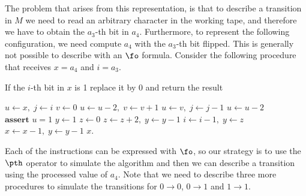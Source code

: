 The problem that arises from this representation, is that to describe a transition in $M$ we need to read an arbitrary character in the working tape, and therefore we have to obtain the $a_3$-th bit in $a_4$. Furthermore, to represent the following configuration, we need compute $a_4$ with the $a_3$-th bit flipped. This is generally not possible to describe with an $\fo$ formula. Consider the following procedure that receives $x = a_4$ and $i = a_3$.

\begin{algorithm}
	\caption{If the $i$-th bit in $x$ is 1 replace it by 0 and return the result}
	\label{switch1to0}
	\begin{algorithmic}
		\State $u \gets x,\; j \gets i$ 
		\State $v \gets 0$
		\State $u \gets u-2,\; v \gets v+1$
		\EndWhile
		\State $u\gets v,\; j \gets j-1$
		\EndWhile
		\State $u \gets u-2$
		\EndWhile
		\State $\textbf{assert } u = 1$ 	
		\State $y \gets 1$ 
		\State $z \gets 0$
		\State $z \gets z+2,\; y \gets y-1$
		\EndWhile
		\State $i \gets i-1,\; y \gets z$
		\EndWhile
		 
		\State $x \gets x-1,\; y \gets y-1$
		\EndWhile
		\State \Return $x$.
	\end{algorithmic}
\end{algorithm}	
Each of the instructions can be expressed with $\fo$, so our strategy is to use the $\pth$ operator to simulate the algorithm and then we can describe a transition using the processed value of $a_4$. Note that we need to describe three more procedures to simulate the transitions for $0\to 0$, $0 \to 1$ and $1\to 1$.

